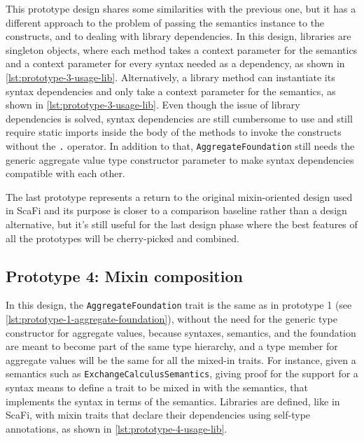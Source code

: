 This prototype design shares some similarities with the previous one, but it has a different approach to the problem of passing the semantics instance to the constructs, and to dealing with library dependencies.
%
In this design, libraries are singleton objects, where each method takes a context parameter for the semantics and a context parameter for every syntax needed as a dependency, as shown in \cref{lst:prototype-3-usage-lib}.
%
Alternatively, a library method can instantiate its syntax dependencies and only take a context parameter for the semantics, as shown in \cref{lst:prototype-3-usage-lib}.
%
Even though the issue of library dependencies is solved, syntax dependencies are still cumbersome to use and still require static imports inside the body of the methods to invoke the constructs without the \texttt{.} operator.
%
In addition to that, \texttt{AggregateFoundation} still needs the generic aggregate value type constructor parameter to make syntax dependencies compatible with each other.



The last prototype represents a return to the original mixin-oriented design used in ScaFi and its purpose is closer to a comparison baseline rather than a design alternative, but it's still useful for the last design phase where the best features of all the prototypes will be cherry-picked and combined.

\subsection{Prototype 4: Mixin composition} \label{chap:design->sec:dsl->subsec:prototype-4-mixin-composition}

In this design, the \texttt{AggregateFoundation} trait is the same as in prototype 1 (see \cref{lst:prototype-1-aggregate-foundation}), without the need for the generic type constructor for aggregate values, because syntaxes, semantics, and the foundation are meant to become part of the same type hierarchy, and a type member for aggregate values will be the same for all the mixed-in traits.
%
For instance, given a semantics such as \texttt{ExchangeCalculusSemantics}, giving proof for the support for a syntax means to define a trait to be mixed in with the semantics, that implements the syntax in terms of the semantics.
%
Libraries are defined, like in ScaFi, with mixin traits that declare their dependencies using self-type annotations, as shown in \cref{lst:prototype-4-usage-lib}.

